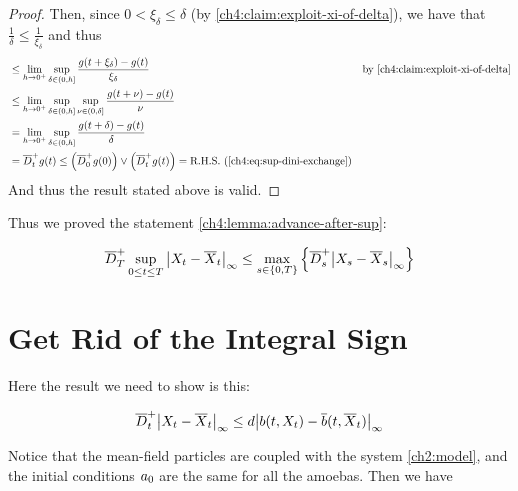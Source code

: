 \begin{proof}
Then, since $0 < \xi_\delta \leq \delta$ (by \ref{ch4:claim:exploit-xi-of-delta}), we have that $\frac{1}{\delta} \leq \frac{1}{\xi_\delta}$ and thus 
	\begin{align*}
	&\leq \lim_{h \rightarrow 0^+} \sup_{\delta \in (0, h]} \frac{
			g(t + \xi_\delta) - g (t)
		}{\xi_\delta}
		&& \text{by }\ref{ch4:claim:exploit-xi-of-delta}
	\\
		&\leq \lim_{h \rightarrow 0^+} \sup_{\delta \in (0, h]} \sup_{\nu \in (0, \delta]}
			\frac{
			g(t + \nu) - g (t)
			}{\nu}
	\\
	& = \lim_{h \rightarrow 0^+} \sup_{\delta \in (0, h]}
		\frac{
			g(t + \delta) - g (t)
		}{\delta}
	\\
	&= \overline{D}^+_t g(t) 
	\leq
			\left(
	\overline{D}^+_0 g(0)
	\right)
	\vee 
	\left(
	\overline{D}^+_t g(t)
	\right) 
	=
	\mbox{R.H.S.\ } (\ref{ch4:eq:sup-dini-exchange})
	\end{align*}
	And thus the result stated above is valid.
\end{proof}

Thus we proved the statement \ref{ch4:lemma:advance-after-sup}:

\begin{equation}
	\overline{D}_T^+ \sup_{0 \leq t \leq T} { \left| X_t-\overline{X}_t \right|_{\infty} }
	\leq
	\max_{ s\in \{0,T\} } \left\{ 
		\overline{D}^+_s 
			{ \left| X_s-\overline{X}_s \right|_{\infty} }
	\right\}
\end{equation}

\section{Get Rid of the Integral Sign}

Here the result we need to show is this:

\begin{lemma}\label{ch4:lemma:get-rid-of-integral}
	\begin{equation*}
		\overline{D}^+_t { \left| X_t-\overline{X}_t \right|_{\infty} }
		 \leq 
		 d { \left| b(t, X_t) - \overline{b}(t, \overline{X}_t) \right|_{\infty} }
	\end{equation*}
\end{lemma}

Notice that the mean-field particles are coupled with the system \ref{ch2:model}, and the initial conditions $a_0$ are the same for all the amoebas. Then we have

